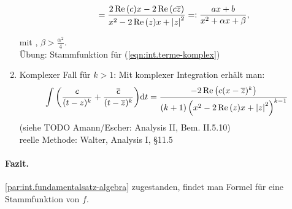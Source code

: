 \documentclass[12pt]{scrreprt}
\begin{document}
\begin{bem}
\begin{enumerate}
\begin{enumerate}
\begin{equation}
          =
          \frac{2\operatorname{Re}{(}c)x-2\operatorname{Re}{(}c\overline{z})}{x^2-2\operatorname{Re}{(}z)x+\left\lvert z\right\lvert^2}
          =: \frac{ax+b}{x^2+\alpha x+\beta},
        \end{equation}
      \end{enumerate}
      mit , $\beta>\frac{\alpha^2}{4}$. \\
      Übung: Stammfunktion für (\ref{eqn:int.terme-komplex})
    \item Komplexer Fall für $k>1$: Mit komplexer Integration erhält
      man:
      \begin{equation}
        \label{eqn:int.komplexe-integration}
        \int{\left(\frac{c}{(t-z)^k}+\frac{\overline{c}}{(t-\overline{z})^k}\right)}\mathrm{d}t
        = \frac{-2\operatorname{Re}{\left(c(x-\overline{z})^k\right)}}{(k+1)\left(x^2-2\operatorname{Re}{(}z)x+\left\lvert z\right\lvert^2\right)^{k-1}}
      \end{equation}
      (siehe TODO Amann/Escher: Analysis II, Bem. II.5.10)\\
      reelle Methode: Walter, Analysis I, §11.5
  \end{enumerate}
  \paragraph{Fazit.} \ref{par:int.fundamentalsatz-algebra}
  zugestanden, findet man Formel für eine Stammfunktion von $f$.
\end{bem}
\end{document}
